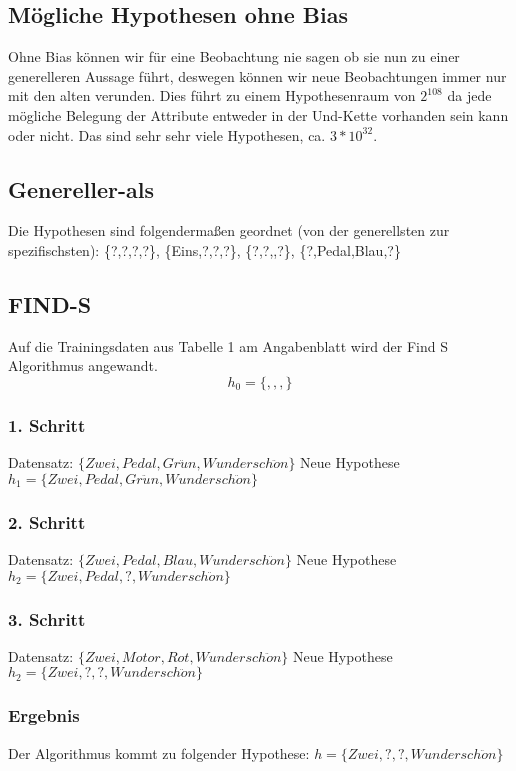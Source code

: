 \documentclass[a4paper]{article}
\begin{document}
\subsection{Mögliche Hypothesen ohne Bias}
Ohne Bias können wir für eine Beobachtung nie sagen ob sie nun zu einer generelleren Aussage führt, deswegen können wir neue Beobachtungen immer nur mit den alten verunden. Dies führt zu einem Hypothesenraum von $2^108$ da jede mögliche Belegung der Attribute entweder in der Und-Kette vorhanden sein kann oder nicht. Das sind sehr sehr viele Hypothesen, ca. $3* 10^32$.

\subsection{Genereller-als}
Die Hypothesen sind folgendermaßen geordnet (von der generellsten zur spezifischsten): \{?,?,?,?\}, \{Eins,?,?,?\}, \{?,?,,?\}, \{?,Pedal,Blau,?\}

\subsection{FIND-S}
Auf die Trainingsdaten aus Tabelle 1 am Angabenblatt wird der Find S Algorithmus angewandt.
\[
	h_0 = \{,,,\}
\]
\subsubsection{1. Schritt}
Datensatz: $ \{Zwei, Pedal, Gr\ddot{u}n, Wundersch\ddot{o}n\} $\newline
Neue Hypothese $ h_1 = \{Zwei, Pedal, Gr\ddot{u}n, Wundersch\ddot{o}n\}$

\subsubsection{2. Schritt}
Datensatz: $ \{Zwei, Pedal, Blau, Wundersch\ddot{o}n\} $\newline
Neue Hypothese $ h_2 = \{Zwei, Pedal, ?, Wundersch\ddot{o}n\}$

\subsubsection{3. Schritt}
Datensatz: $ \{Zwei, Motor, Rot, Wundersch\ddot{o}n\} $\newline
Neue Hypothese $ h_2 = \{Zwei, ?, ?, Wundersch\ddot{o}n\}$

\subsubsection{Ergebnis}
Der Algorithmus kommt zu folgender Hypothese: $ h = \{Zwei, ?, ?, Wundersch\ddot{o}n\}$
\end{document}

